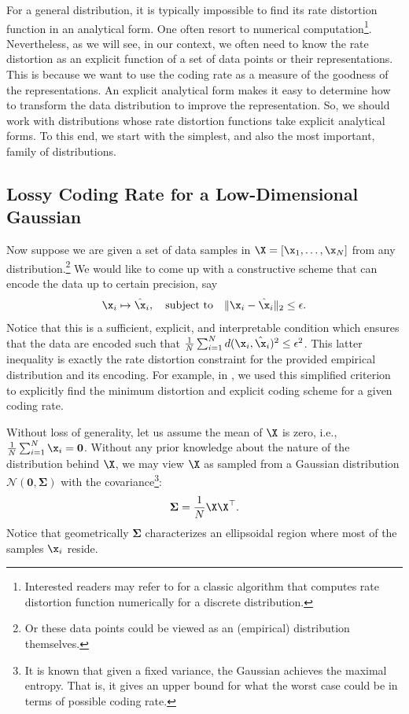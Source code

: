 \documentclass[../../book-main.tex]{subfiles}
\begin{document}
For a general distribution, it is typically impossible to find its rate distortion function in an analytical form. One often resort to numerical computation\footnote{Interested readers may refer to \cite{Blahut-1972} for a classic algorithm that computes rate distortion function numerically for a discrete distribution.}.  Nevertheless, as we will see, in our context, we often need to know the rate distortion as an explicit function of a set of data points or their representations. This is because we want to use the coding rate as a measure of the goodness of the representations. An explicit analytical form makes it easy to determine how to transform the data distribution to improve the representation. So, we should work with distributions whose rate distortion functions take explicit analytical forms. To this end, we start with the simplest, and also the most important, family of distributions.

\subsection{Lossy Coding Rate for a Low-Dimensional Gaussian}\label{subsec:lossy DR}
Now suppose we are given a set of data samples in $\X = [\x_1, \ldots, \x_N]$ from any distribution.\footnote{Or these data points could be viewed as an (empirical) distribution themselves.} We would like to come up with a constructive scheme that can encode the data up to certain precision, say
\begin{equation}
	\x_i \mapsto \hat \x_i, \quad \mbox{subject to} \quad \|\x_i - \hat \x_i\|_2 \le \epsilon.
\end{equation}
Notice that this is a sufficient, explicit, and interpretable condition which ensures that the data are encoded such that \(\frac{1}{N}\sum_{i = 1}^{N} d(\x_i, \hat \x_i)^{2} \le \epsilon^{2}\). This latter inequality is exactly the rate distortion constraint for the provided empirical distribution and its encoding. For example, in , we used this simplified criterion to explicitly find the minimum distortion and explicit coding scheme for a given coding rate.

Without loss of generality, let us assume the mean of $\X$ is zero, i.e., $\frac{1}{N} \sum_{i = 1}^{N} \x_i = \boldsymbol{0}$. Without any prior knowledge about the nature of the distribution behind $\X$, we may view $\X$ as sampled from a Gaussian distribution $\mathcal{N}(\boldsymbol{0}, {\boldsymbol{\Sigma}})$ with the covariance\footnote{It is known that given a fixed variance, the Gaussian achieves the maximal entropy. That is, it gives an upper bound for what the worst case could be in terms of possible coding rate.}:
\begin{equation}
	{\boldsymbol{\Sigma}} = \frac{1}{N} \X\X^\top.
\end{equation}
Notice that geometrically ${\boldsymbol{\Sigma}}$ characterizes an ellipsoidal region where most of the samples $\x_i$ reside.
\end{document}

